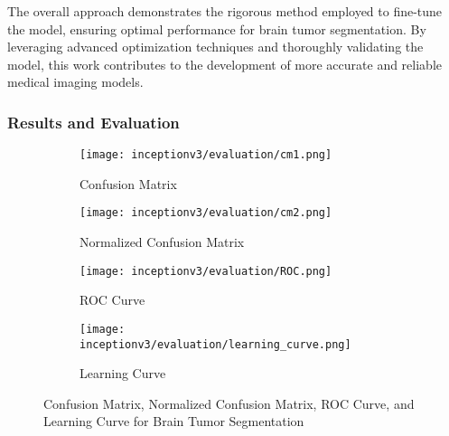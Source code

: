 The overall approach demonstrates the rigorous method employed to fine-tune the model, ensuring optimal performance for brain tumor segmentation. By leveraging advanced optimization techniques and thoroughly validating the model, this work contributes to the development of more accurate and reliable medical imaging models.

\subsubsection{Results and Evaluation}

\begin{figure}[H]
  \centering
  \begin{subfigure}[b]{0.2\textwidth}
    \centering
    \texttt{[image: inceptionv3/evaluation/cm1.png]}
    \caption{Confusion Matrix}
    \label{fig:inceptionv3_cm1}
  \end{subfigure}
  \hfill
  \begin{subfigure}[b]{0.2\textwidth}
    \centering
    \texttt{[image: inceptionv3/evaluation/cm2.png]}
    \caption{Normalized Confusion Matrix}
    \label{fig:inceptionv3_cm2}
  \end{subfigure}
  \hfill
  \begin{subfigure}[b]{0.25\textwidth}
    \centering
    \texttt{[image: inceptionv3/evaluation/ROC.png]}
    \caption{ROC Curve}
    \label{fig:inceptionv3_roc}
  \end{subfigure}
  \hfill
  \begin{subfigure}[b]{0.25\textwidth}
    \centering
    \texttt{[image: inceptionv3/evaluation/learning\_curve.png]}
    \caption{Learning Curve}
    \label{fig:inceptionv3_learning_curve}
  \end{subfigure}
  \caption{Confusion Matrix, Normalized Confusion Matrix, ROC Curve, and Learning Curve for Brain Tumor Segmentation}
  \label{fig:inceptionv3_evaluation}
\end{figure}


